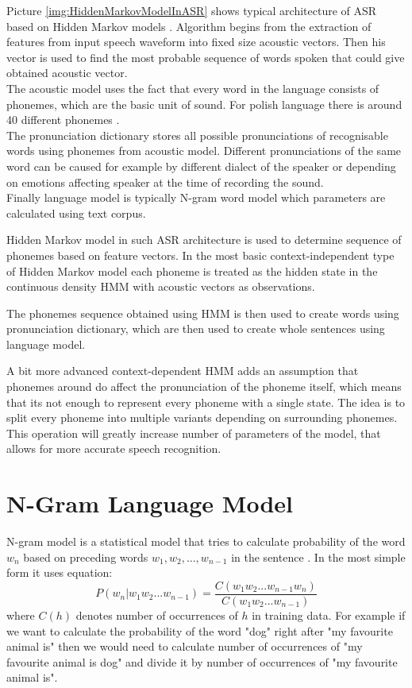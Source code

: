 \documentclass[a4paper,11pt,twoside]{report}
\theoremstyle{definition}
\begin{document}
Picture \ref{img:HiddenMarkovModelInASR} shows typical architecture of ASR based on Hidden Markov models \cite{HMMinASR}. Algorithm begins from the extraction of features from input speech waveform into fixed size acoustic vectors. Then his vector is used to find the most probable sequence of words spoken that could give obtained acoustic vector.\\
The acoustic model uses the fact that every word in the language consists of phonemes, which are the basic unit of sound. For polish language there is around 40 different phonemes \cite{PolishPhonemes}.\\
The pronunciation dictionary stores all possible pronunciations of recognisable words using phonemes from acoustic model. Different pronunciations of the same word can be caused for example by different dialect of the speaker or depending on emotions affecting speaker at the time of recording the sound.\\
Finally language model is typically N-gram word model which parameters are calculated using text corpus.

Hidden Markov model in such ASR architecture is used to determine sequence of phonemes based on feature vectors. In the most basic context-independent type of Hidden Markov model each phoneme is treated as the hidden state in the continuous density HMM with acoustic vectors as observations. 

The phonemes sequence obtained using HMM is then used to create words using pronunciation dictionary, which are then used to create whole sentences using language model.

A bit more advanced context-dependent HMM adds an assumption that phonemes around do affect the pronunciation of the phoneme itself, which means that its not enough to represent every phoneme with a single state. The idea is to split every phoneme into multiple variants depending on surrounding phonemes. This operation will greatly increase number of parameters of the model, that allows for more accurate speech recognition.  


\section{N-Gram Language Model}

N-gram model is a statistical model that tries to calculate probability of the word $w_n$ based on preceding words $w_1, w_2, ..., w_{n-1}$ in the sentence \cite{HMM, NGram}. In the most simple form it uses equation:
$$
P(w_n|w_1 w_2 ... w_{n-1}) = \frac{C(w_1 w_2 ... w_{n-1} w_n)}{C(w_1 w_2 ... w_{n-1})}
$$
where $C(h)$ denotes number of occurrences of $h$ in training data. For example if we want to calculate the probability of the word "dog" right after "my favourite animal is" then we would need to calculate number of occurrences of "my favourite animal is dog" and divide it by number of occurrences of "my favourite animal is". 
\end{document}
